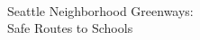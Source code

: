 \documentclass[12pt, letterpaper, article, landscape]{memoir}
\begin{document}
\date{Prepared: 14 June 2014}
\pagestyle{empty}

\par\noindent \\
\vspace{2in}
\centering
\HUGE \par\noindent Seattle Neighborhood Greenways:\\
\huge Safe Routes to Schools
\vfill

\small\thedate
\end{document}
